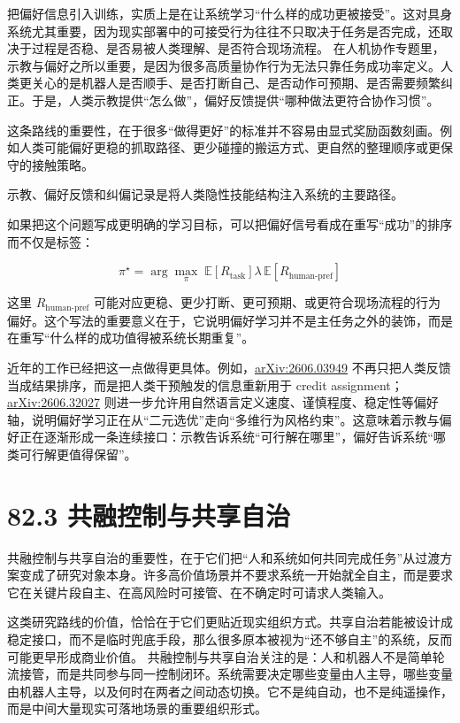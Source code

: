 把偏好信息引入训练，实质上是在让系统学习“什么样的成功更被接受”。这对具身系统尤其重要，因为现实部署中的可接受行为往往不只取决于任务是否完成，还取决于过程是否稳、是否易被人类理解、是否符合现场流程。 在人机协作专题里，示教与偏好之所以重要，是因为很多高质量协作行为无法只靠任务成功率定义。人类更关心的是机器人是否顺手、是否打断自己、是否动作可预期、是否需要频繁纠正。于是，人类示教提供“怎么做”，偏好反馈提供“哪种做法更符合协作习惯”。

这条路线的重要性，在于很多“做得更好”的标准并不容易由显式奖励函数刻画。例如人类可能偏好更稳的抓取路径、更少碰撞的搬运方式、更自然的整理顺序或更保守的接触策略。

示教、偏好反馈和纠偏记录是将人类隐性技能结构注入系统的主要路径。

如果把这个问题写成更明确的学习目标，可以把偏好信号看成在重写“成功”的排序而不仅是标签：

\begingroup
\scriptsize
\begin{equation*}
\pi^\star = \arg\max_{\pi}\; \mathbb{E}[R_{\text{task}}]
\lambda \, \mathbb{E}[R_{\text{human-pref}}]
\end{equation*}
\endgroup

这里 \(R_{\text{human-pref}}\) 可能对应更稳、更少打断、更可预期、或更符合现场流程的行为偏好。这个写法的重要意义在于，它说明偏好学习并不是主任务之外的装饰，而是在重写“什么样的成功值得被系统长期重复”。

近年的工作已经把这一点做得更具体。例如，\href{https://arxiv.org/abs/2606.03949}{arXiv:2606.03949} 不再只把人类反馈当成结果排序，而是把人类干预触发的信息重新用于 credit assignment；\href{https://arxiv.org/abs/2606.32027}{arXiv:2606.32027} 则进一步允许用自然语言定义速度、谨慎程度、稳定性等偏好轴，说明偏好学习正在从“二元选优”走向“多维行为风格约束”。这意味着示教与偏好正在逐渐形成一条连续接口：示教告诉系统“可行解在哪里”，偏好告诉系统“哪类可行解更值得保留”。

\section*{82.3 共融控制与共享自治}


共融控制与共享自治的重要性，在于它们把“人和系统如何共同完成任务”从过渡方案变成了研究对象本身。许多高价值场景并不要求系统一开始就全自主，而是要求它在关键片段自主、在高风险时可接管、在不确定时可请求人类输入。

这类研究路线的价值，恰恰在于它们更贴近现实组织方式。共享自治若能被设计成稳定接口，而不是临时兜底手段，那么很多原本被视为“还不够自主”的系统，反而可能更早形成商业价值。 共融控制与共享自治关注的是：人和机器人不是简单轮流接管，而是共同参与同一控制闭环。系统需要决定哪些变量由人主导，哪些变量由机器人主导，以及何时在两者之间动态切换。它不是纯自动，也不是纯遥操作，而是中间大量现实可落地场景的重要组织形式。

